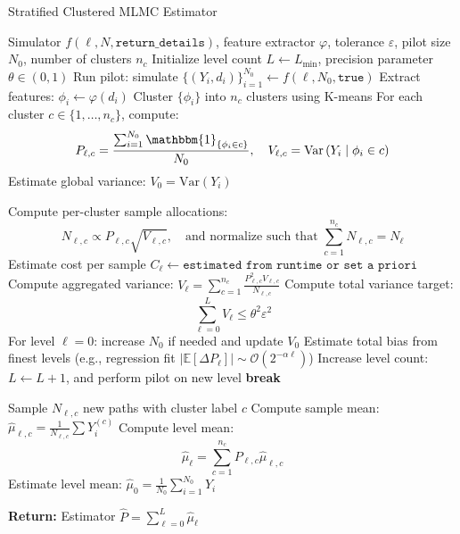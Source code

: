 \documentclass{article}
\begin{document}
\begin{algorithm}[H]
    \caption{Stratified Clustered MLMC Estimator}
    \label{alg:strat-cmlmc}
    \begin{algorithmic}[1]
    \REQUIRE Simulator \( f(\ell, N, \texttt{return\_details}) \), feature extractor \( \varphi \), tolerance \( \varepsilon \), pilot size \( N_0 \), number of clusters \( n_c \)
    \STATE Initialize level count \( L \leftarrow L_{\min} \), precision parameter \( \theta \in (0,1) \)
        \STATE Run pilot: simulate \( \{(Y_i, d_i)\}_{i=1}^{N_0} \leftarrow f(\ell, N_0, \texttt{true}) \)
            \STATE Extract features: \( \phi_i \leftarrow \varphi(d_i) \)
            \STATE Cluster \( \{\phi_i\} \) into \( n_c \) clusters using K-means
            \STATE For each cluster \( c \in \{1,\dots,n_c\} \), compute:
            \[
            P_{\ell,c} = \frac{\sum_{i=1}^{N_0} \mathbbm{1}_{\{\phi_i \in c\}}}{N_0}, \quad
            V_{\ell,c} = \mathrm{Var}\left(Y_i \mid \phi_i \in c\right)
            \]
        \ELSE
            \STATE Estimate global variance: \( V_0 = \mathrm{Var}(Y_i) \)
        \ENDIF
    \ENDFOR
    
            \STATE Compute per-cluster sample allocations:
            \[
            N_{\ell,c} \propto P_{\ell,c} \sqrt{V_{\ell,c}}, \quad \text{and normalize such that } \sum_{c=1}^{n_c} N_{\ell,c} = N_\ell
            \]
            \STATE Estimate cost per sample \( C_\ell \gets \texttt{estimated from runtime or set a priori} \)
            \STATE Compute aggregated variance: \( V_\ell = \sum_{c=1}^{n_c} \frac{P_{\ell,c}^2 V_{\ell,c}}{N_{\ell,c}} \)
        \ENDFOR
        \STATE Compute total variance target:
        \[
        \sum_{\ell=0}^L V_\ell \le \theta^2 \varepsilon^2
        \]
        \STATE For level \( \ell = 0 \): increase \( N_0 \) if needed and update \( V_0 \)
        \STATE Estimate total bias from finest levels (e.g., regression fit \( |\mathbb{E}[\Delta P_\ell]| \sim \mathcal{O}(2^{-\alpha \ell}) \))
            \STATE Increase level count: \( L \leftarrow L + 1 \), and perform pilot on new level
        \ELSE
            \STATE \textbf{break}
        \ENDIF
    \ENDWHILE
    
                \STATE Sample \( N_{\ell,c} \) new paths with cluster label \( c \)
                \STATE Compute sample mean: \( \hat{\mu}_{\ell,c} = \frac{1}{N_{\ell,c}} \sum Y_i^{(c)} \)
            \ENDFOR
            \STATE Compute level mean:
            \[
            \hat{\mu}_\ell = \sum_{c=1}^{n_c} P_{\ell,c} \hat{\mu}_{\ell,c}
            \]
        \ELSE
            \STATE Estimate level mean: \( \hat{\mu}_0 = \frac{1}{N_0} \sum_{i=1}^{N_0} Y_i \)
        \ENDIF
    \ENDFOR
    
    \STATE \textbf{Return:} Estimator \( \hat{P} = \sum_{\ell=0}^L \hat{\mu}_\ell \)
    \end{algorithmic}
    \end{algorithm}
\end{document}
